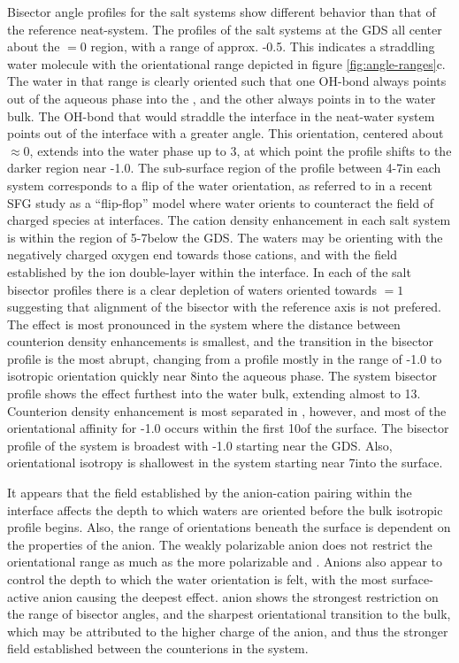 Bisector angle profiles for the salt systems show different behavior than that of the reference neat-\wat system. The profiles of the salt systems at the GDS all center about the \costheta$=0$ region, with a range of approx. -0.5. This indicates a straddling water molecule with the orientational range depicted in figure \ref{fig:angle-ranges}c. The water in that range is clearly oriented such that one OH-bond always points out of the aqueous phase into the \ctc, and the other always points in to the water bulk. The OH-bond that would straddle the interface in the neat-water system points out of the interface with a greater angle. This orientation, centered about \costheta$\approx 0$, extends into the water phase up to 3\angs, at which point the profile shifts to the darker region near -1.0. The sub-surface region of the profile between 4-7\angs in each system corresponds to a flip of the water orientation, as referred to in a recent SFG study as a ``flip-flop'' model where water orients to counteract the field of charged species at interfaces.\cite{Nihonyanagi2009} The cation density enhancement in each salt system is within the region of 5-7\angs below the GDS. The waters may be orienting with the negatively charged oxygen end towards those cations, and with the field established by the ion double-layer within the interface. In each of the salt bisector profiles there is a clear depletion of waters oriented towards \costheta$=1$ suggesting that alignment of the bisector with the reference axis is not prefered. The effect is most pronounced in the \sodsul system where the distance between counterion density enhancements is smallest, and the transition in the bisector profile is the most abrupt, changing from a profile mostly in the range of -1.0 to isotropic orientation quickly near 8\angs into the aqueous phase. The \sodnit system bisector profile shows the effect furthest into the water bulk, extending almost to 13\angs. Counterion density enhancement is most separated in \sodnit, however, and most of the orientational affinity for -1.0 occurs within the first 10\angs of the surface. The bisector profile of the \nacl system is broadest with -1.0 starting near the GDS. Also, orientational isotropy is shallowest in the \nacl system starting near 7\angs into the surface.

It appears that the field established by the anion-cation pairing within the interface affects the depth to which waters are oriented before the bulk isotropic profile begins. Also, the range of orientations beneath the surface is dependent on the properties of the anion. The weakly polarizable \cl anion does not restrict the orientational range as much as the more polarizable \nit and \sul. Anions also appear to control the depth to which the water orientation is felt, with the most surface-active \nit anion causing the deepest effect. \sul anion shows the strongest restriction on the range of bisector angles, and the sharpest orientational transition to the bulk, which may be attributed to the higher charge of the anion, and thus the stronger field established between the counterions in the system.

